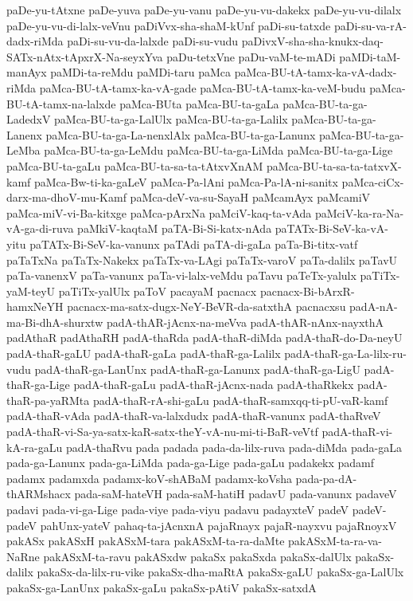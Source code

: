 {paDe-yu-tAtxne
paDe-yuva
paDe-yu-vanu
paDe-yu-vu-dakekx
paDe-yu-vu-dilalx
paDe-yu-vu-di-lalx-veVnu
paDiVvx-sha-shaM-kUnf
paDi-su-tatxde
paDi-su-va-rA-dadx-riMda
paDi-su-vu-da-lalxde
paDi-su-vudu
paDivxV-sha-sha-knukx-daq-SATx-nAtx-tApxrX-Na-seyxYva
paDu-tetxVne
paDu-vaM-te-mADi
paMDi-taM-manAyx
paMDi-ta-reMdu
paMDi-taru
paMca
paMca-BU-tA-tamx-ka-vA-dadx-riMda
paMca-BU-tA-tamx-ka-vA-gade
paMca-BU-tA-tamx-ka-veM-budu
paMca-BU-tA-tamx-na-lalxde
paMca-BUta
paMca-BU-ta-gaLa
paMca-BU-ta-ga-LadedxV
paMca-BU-ta-ga-LalUlx
paMca-BU-ta-ga-Lalilx
paMca-BU-ta-ga-Lanenx
paMca-BU-ta-ga-La-nenxlAlx
paMca-BU-ta-ga-Lanunx
paMca-BU-ta-ga-LeMba
paMca-BU-ta-ga-LeMdu
paMca-BU-ta-ga-LiMda
paMca-BU-ta-ga-Lige
paMca-BU-ta-gaLu
paMca-BU-ta-sa-ta-tAtxvXnAM
paMca-BU-ta-sa-ta-tatxvX-kamf
paMca-Bw-ti-ka-gaLeV
paMca-Pa-lAni
paMca-Pa-lA-ni-sanitx
paMca-ciCx-darx-ma-dhoV-mu-Kamf
paMca-deV-va-su-SayaH
paMcamAyx
paMcamiV
paMca-miV-vi-Ba-kitxge
paMca-pArxNa
paMciV-kaq-ta-vAda
paMciV-ka-ra-Na-vA-ga-di-ruva
paMkiV-kaqtaM
paTA-Bi-Si-katx-nAda
paTATx-Bi-SeV-ka-vA-yitu
paTATx-Bi-SeV-ka-vanunx
paTAdi
paTA-di-gaLa
paTa-Bi-titx-vatf
paTaTxNa
paTaTx-Nakekx
paTaTx-va-LAgi
paTaTx-varoV
paTa-dalilx
paTavU
paTa-vanenxV
paTa-vanunx
paTa-vi-lalx-veMdu
paTavu
paTeTx-yalulx
paTiTx-yaM-teyU
paTiTx-yalUlx
paToV
pacayaM
pacnacx
pacnacx-Bi-bArxR-hamxNeYH
pacnacx-ma-satx-dugx-NeY-BeVR-da-satxthA
pacnacxsu
padA-nA-ma-Bi-dhA-shurxtw
padA-thAR-jAcnx-na-meVva
padA-thAR-nAnx-nayxthA
padAthaR
padAthaRH
padA-thaRda
padA-thaR-diMda
padA-thaR-do-Da-neyU
padA-thaR-gaLU
padA-thaR-gaLa
padA-thaR-ga-Lalilx
padA-thaR-ga-La-lilx-ru-vudu
padA-thaR-ga-LanUnx
padA-thaR-ga-Lanunx
padA-thaR-ga-LigU
padA-thaR-ga-Lige
padA-thaR-gaLu
padA-thaR-jAcnx-nada
padA-thaRkekx
padA-thaR-pa-yaRMta
padA-thaR-rA-shi-gaLu
padA-thaR-samxqq-ti-pU-vaR-kamf
padA-thaR-vAda
padA-thaR-va-lalxdudx
padA-thaR-vanunx
padA-thaRveV
padA-thaR-vi-Sa-ya-satx-kaR-satx-theY-vA-nu-mi-ti-BaR-veVtf
padA-thaR-vi-kA-ra-gaLu
padA-thaRvu
pada
padada
pada-da-lilx-ruva
pada-diMda
pada-gaLa
pada-ga-Lanunx
pada-ga-LiMda
pada-ga-Lige
pada-gaLu
padakekx
padamf
padamx
padamxda
padamx-koV-shABaM
padamx-koVsha
pada-pa-dA-thARMshacx
pada-saM-hateVH
pada-saM-hatiH
padavU
pada-vanunx
padaveV
padavi
pada-vi-ga-Lige
pada-viye
pada-viyu
padavu
padayxteV
padeV
padeV-padeV
pahUnx-yateV
pahaq-ta-jAcnxnA
pajaRnayx
pajaR-nayxvu
pajaRnoyxV
pakASx
pakASxH
pakASxM-tara
pakASxM-ta-ra-daMte
pakASxM-ta-ra-va-NaRne
pakASxM-ta-ravu
pakASxdw
pakaSx
pakaSxda
pakaSx-dalUlx
pakaSx-dalilx
pakaSx-da-lilx-ru-vike
pakaSx-dha-maRtA
pakaSx-gaLU
pakaSx-ga-LalUlx
pakaSx-ga-LanUnx
pakaSx-gaLu
pakaSx-pAtiV
pakaSx-satxdA
}

